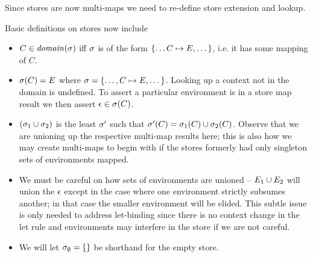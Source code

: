 Since stores are now multi-maps we need to re-define store extension and lookup.
\begin{definition}
  Basic definitions on stores now include
  \begin{itemize}
  \item $C \in \mathit{domain}(\sigma)$ iff $\sigma$ is of the form $\{\dots C \mapsto E, \dots\}$, i.e. it has some mapping of $C$.
  \item $\sigma(C) = E $ where $\sigma = \{\dots, C \mapsto  E,\dots\}$.  Looking up a context not in the domain is undefined.  To assert a particular environment is in a store map result we then assert $\epsilon \in \sigma(C)$.
  \item $(\sigma_1 \cup \sigma_2)$ is the least $\sigma'$ such that $\sigma'(C) = \sigma_1(C) \cup \sigma_2(C)$.  Observe that we are unioning up the respective multi-map results here; this is also how we may create multi-maps to begin with if the stores formerly had only singleton sets of environments mapped.
  \item We must be careful on how sets of environments are unioned -- $E_1 \cup E_2$ will union the $\epsilon$ except in the case where one environment strictly subsumes another; in that case the smaller environment will be elided.  This subtle issue is only needed to address let-binding since there is no context change in the let rule and environments may interfere in the store if we are not careful.
  \item We will let $\sigma_\emptyset = \{\}$ be shorthand for the empty store.
  \end{itemize}
\end{definition}

